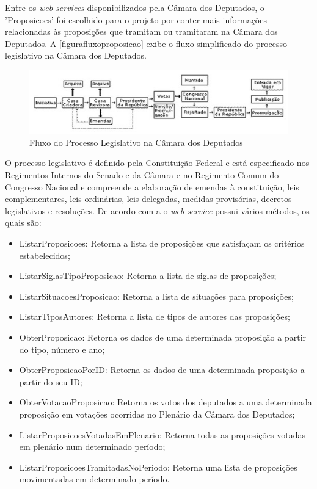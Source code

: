 \documentclass[
	12pt,				%
	openright,			%
	twoside,			%
	a4paper,			%
	english,			%
	french,				%
	spanish,			%
	brazil				%
	]{abntex2}
\begin{document}
Entre os \emph{web services} disponibilizados pela Câmara dos Deputados, o 'Proposicoes' foi escolhido para o projeto por
conter mais informações relacionadas às proposições que tramitam ou tramitaram na Câmara dos Deputados. A \autoref{figurafluxoproposicao} 
exibe o fluxo simplificado do processo legislativo na Câmara dos Deputados.
\begin{figure}[htb]
	\caption{\label{figurafluxoproposicao}Fluxo do Processo Legislativo na Câmara dos Deputados}
	\begin{center}
	    \includegraphics[scale=0.9]{fluxo.jpg}
	\end{center}
\end{figure}
O processo legislativo é definido pela Constituição Federal e está especificado nos Regimentos Internos do Senado e da Câmara e no 
Regimento Comum do Congresso Nacional e compreende a elaboração de emendas à constituição, leis complementares, leis 
ordinárias, leis delegadas, medidas provisórias, decretos legislativos e resoluções.
De acordo com a  o \emph{web service} possui vários métodos, os quais são:
\begin{itemize}
  \item ListarProposicoes: Retorna a lista de proposições que satisfaçam os critérios estabelecidos;
  \item ListarSiglasTipoProposicao: Retorna a lista de siglas de proposições;
  \item ListarSituacoesProposicao: Retorna a lista de situações para proposições;
  \item ListarTiposAutores: Retorna a lista de tipos de autores das proposições;
  \item ObterProposicao: Retorna os dados de uma determinada proposição a partir do tipo, número e ano;
  \item ObterProposicaoPorID: Retorna os dados de uma determinada proposição a partir do seu ID;
  \item ObterVotacaoProposicao: Retorna os votos dos deputados a uma determinada proposição em votações ocorridas no Plenário da Câmara dos Deputados;
  \item ListarProposicoesVotadasEmPlenario: Retorna todas as proposições votadas em plenário num determinado período;
  \item ListarProposicoesTramitadasNoPeriodo: Retorna uma lista de proposições movimentadas em determinado período.
\end{itemize}
\end{document}
